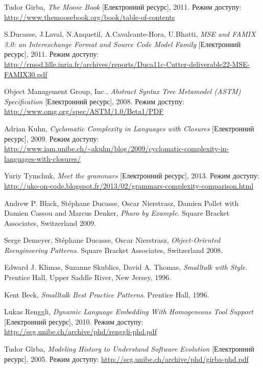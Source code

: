 \documentclass[12pt,a4paper]{article}
\begin{document}
\begin{thebibliography}{9}

Tudor Girba, \emph{The Moose Book} [Електронний ресурс],
    2011. Режим доступу:
    \url{http://www.themoosebook.org/book/table-of-contents}

S.Ducasse, J.Laval, N.Anquetil, A.Cavalcante-Hora, U.Bhatti, \emph{MSE and FAMIX 3.0: an Interexchange Format and Source Code Model Family} [Електронний ресурс], 2011. Режим доступу:
    \url{http://rmod.lille.inria.fr/archives/reports/Duca11c-Cutter-deliverable22-MSE-FAMIX30.pdf}
    
Object Management Group, Inc., \emph{Abstract Syntax Tree Metamodel (ASTM) Specification} [Електронний ресурс], 2008. Режим доступу:
    \url{http://www.omg.org/spec/ASTM/1.0/Beta1/PDF}

Adrian Kuhn, \emph{Cyclomatic Complexity in Languages with Closures} [Електронний ресурс], 2009. Режим доступу:
    \url{http://www.iam.unibe.ch/~akuhn/blog/2009/cyclomatic-complexity-in-languages-with-closures/}

Yuriy Tymchuk, \emph{Meet the grammars} [Електронний ресурс], 2013. Режим доступу:
    \url{http://uko-on-code.blogspot.fr/2013/02/grammars-complexity-comparison.html}
    
Andrew P. Black, Stéphane Ducasse, Oscar Nierstrasz, Damien Pollet with Damien Cassou and Marcus Denker, \emph{Pharo by Example}. Square Bracket Associates, Switzerland 2009.

Serge Demeyer, Stéphane Ducasse, Oscar Nierstrasz, \emph{Object-Oriented Reengineering Patterns}. Square Bracket Associates, Switzerland 2008.

Edward J. Klimas, Suzanne Skublics, David A. Thomas, \emph{Smalltalk with Style}. Prentice Hall, Upper Saddle River, New Jersey, 1996.

Kent Beck, \emph{Smalltalk Best Practice Patterns}. Prentice Hall, 1996.

Lukas Renggli, \emph{Dynamic Language Embedding With Homogeneous Tool Support} [Електронний ресурс], 2010. Режим доступу:
    \url{http://scg.unibe.ch/archive/phd/renggli-phd.pdf}
    
Tudor Gîrba, \emph{Modeling History to Understand Software Evolution} [Електронний ресурс], 2005. Режим доступу:
    \url{http://scg.unibe.ch/archive/phd/girba-phd.pdf}    


\end{thebibliography}
\end{document}
